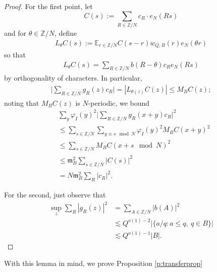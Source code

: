 \documentclass[12pt]{amsart}
\numberwithin{equation}{section}
\theoremstyle{definition}
\begin{document}
\begin{proof}
    For the first point, let
    \[ C(s) := \sum_{R \in \mathbb{Z}/N} c_R \cdot e_N(Rs) \]
and for $\theta \in \mathbb{Z}/N$, define
\begin{align}
    L_\theta C(s) := \mathbb{E}_{r \in \mathbb{Z}/N} C(s-r) w_{Q,B}(r) e_N(\theta r)
\end{align}
so that
\begin{align}
    L_\theta C(s) = \sum_{R \in \mathbb{Z}/N} b(R-\theta) c_R e_N(Rs)
\end{align}
by orthogonality of characters. In particular,
\begin{align}
    \big| \sum_{R \in \mathbb{Z}/N} g_R(z) c_R \big| = | L_{\theta(z)} C(z)| \leq M_BC(z);
\end{align}
noting that $M_B C(z)$ is $N$-periodic, we bound
    \begin{align}
        &\sum_y \varphi_I(y)^2 \big| \sum_{R \in \mathbb{Z}/N} g_R(x+y) c_R \big|^2 \\
        & \leq \sum_{s \in \mathbb{Z}/N} \sum_{y \equiv s \mod N} \varphi_I(y)^2 M_BC(x+y)^2 \\
        & \leq \sum_{s \in \mathbb{Z}/N} M_BC(x+s \mod N)^2 \\
        & \leq \mathfrak m_B^2 \sum_{s \in \mathbb{Z}/N} |C(s)|^2 \\
        & = N \mathfrak m_B^2 \sum_R |c_R|^2. 
    \end{align}

For the second, just observe that
\begin{align}
    \sup_z \sum_R |g_R(z)|^2 &= \sum_{A \in \mathbb{Z}/N} |b(A)|^2 \\ &\lesssim Q^{o(1)-2} |\{ a/q : a \leq q, \ q \in B\}| \\
    &\lesssim Q^{o(1)-1} |B|.
\end{align}
    
\end{proof}

With this lemma in mind, we prove Proposition \ref{p:transferprop}
\end{document}
